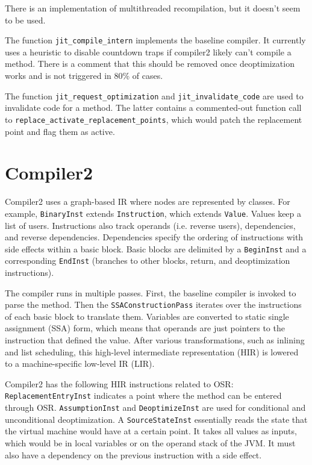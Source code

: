 \documentclass[draft,final]{vutinfth} %
\begin{document}
    There is an implementation of multithreaded recompilation,
    but it doesn't seem to be used.

    The function \lstinline{jit_compile_intern} implements the baseline compiler.
    It currently uses a heuristic to disable countdown traps if compiler2 likely can't compile a method.
    There is a comment that this should be removed once deoptimization works and is not triggered in 80\% of cases.

    The function \lstinline{jit_request_optimization} and \lstinline{jit_invalidate_code} are used to invalidate
    code for a method.
    The latter contains a commented-out function call to \linebreak \lstinline{replace_activate_replacement_points},
    which would patch the replacement point and flag them as active.


    \section{Compiler2}

    Compiler2 uses a graph-based IR
    where nodes are represented by classes.
    For example, \lstinline{BinaryInst} extends \lstinline{Instruction}, which extends \lstinline{Value}.
    Values keep a list of users.
    Instructions also track operands (i.e. reverse users), dependencies, and reverse dependencies.
    Dependencies specify the ordering of instructions with side effects within a basic block.
    Basic blocks are delimited by a \lstinline{BeginInst} and a corresponding \lstinline{EndInst} (branches to other blocks, return, and deoptimization instructions).

    The compiler runs in multiple passes.
    First, the baseline compiler is invoked to parse the method.
    Then the \lstinline{SSAConstructionPass} iterates over the instructions of each basic block to translate them.
    Variables are converted to static single assignment (SSA) form, which means that operands are just pointers to the
    instruction that defined the value.
    After various transformations, such as inlining and list scheduling, this high-level intermediate representation (HIR)
    is lowered to a machine-specific low-level IR (LIR).

    Compiler2 has the following HIR instructions related to OSR:
    \lstinline{ReplacementEntryInst} indicates a point where the method can be entered through OSR.
    \lstinline{AssumptionInst} and \lstinline{DeoptimizeInst} are used for conditional and unconditional deoptimization.
    A \lstinline{SourceStateInst} essentially reads the state that the virtual machine would have at a certain point.
    It takes all values as inputs, which would be in local variables or on the operand stack of the JVM.
    It must also have a dependency on the previous instruction with a side effect.
\end{document}
